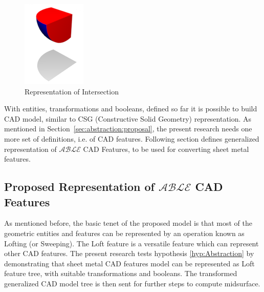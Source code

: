\begin{itemize}[noitemsep,topsep=2pt,parsep=2pt,partopsep=2pt]

\begin{figure}[!h]
\centering 
\includegraphics[width=0.23\linewidth]{images/wikiintersect} 
\caption{Representation of Intersection}
\label{fig:abstraction:hodaintersect}
\end{figure}


\end{itemize}

With entities, transformations and booleans, defined so far it is possible to build CAD model, similar to CSG (Constructive Solid Geometry) representation. As mentioned in Section~\ref{sec:abstraction:proposal}, the present research needs one more set of definitions, i.e. of CAD features. Following section defines generalized representation of $\mathcal{ABLE}$ CAD Features, to be used for converting sheet metal features.

\subsection{Proposed Representation of $\mathcal{ABLE}$ CAD Features}

As mentioned before, the basic tenet of the proposed model is that most of the geometric entities and features can be represented by an operation known as Lofting (or Sweeping). 
The Loft feature is a versatile feature which can represent other CAD features. The present research tests hypothesis \ref{hyp:Abstraction} by demonstrating that sheet metal CAD features model can be represented as Loft feature tree, with suitable transformations and booleans. The transformed generalized CAD model tree is then sent for further steps to compute midsurface.




